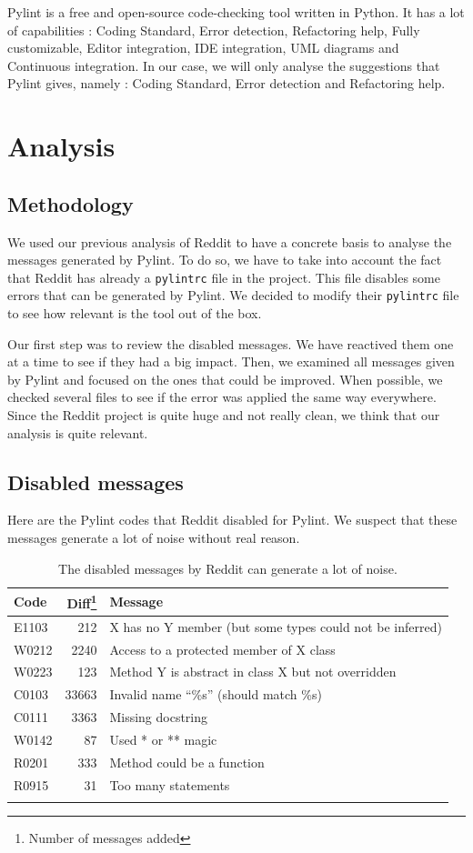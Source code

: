 \documentclass[12pt, a4paper]{article}
\newcommand{\pyl}{\textsf{Pylint}}
\begin{document}
\pyl{} is a free and open-source code-checking tool written in Python.
It has a lot of capabilities : Coding Standard, Error detection, Refactoring help, Fully customizable, Editor integration, IDE integration, UML diagrams and Continuous integration.
In our case, we will only analyse the suggestions that \pyl{} gives, namely : Coding Standard, Error detection and Refactoring help.
\bigskip
\section*{Analysis}
\smallskip
\subsection*{Methodology}

We used our previous analysis of Reddit to have a concrete basis to analyse the messages generated by \pyl{}.
To do so, we have to take into account the fact that Reddit has already a \texttt{pylintrc} file in the project.
This file disables some errors that can be generated by \pyl{}.
We decided to modify their \texttt{pylintrc} file to see how relevant is the tool out of the box.\\
\medskip


Our first step was to review the disabled messages.
We have reactived them one at a time to see if they had a big impact.
Then, we examined all messages given by \pyl{} and focused on the ones that could be improved.
When possible, we checked several files to see if the error was applied the same way everywhere.
Since the Reddit project is quite huge and not really clean, we think that our analysis is quite relevant.
\newpage
\subsection*{Disabled messages}
Here are the \pyl{} codes that Reddit disabled for \pyl{}. 
We suspect that these messages generate a lot of noise without real reason.
\\

\begin{longtable}{|l|r|m{9cm}|}
\hline
\textbf{\small{Code}} & \textbf{\small{Diff\footnote{Number of messages added}}} & \textbf{\small{Message}} \\
\hline
\hline
E1103 & 212 & X has no Y member (but some types could not be inferred) \\
\hline
W0212 & 2240  & Access to a protected member of X class \\
\hline
W0223 & 123 & Method Y is abstract in class X but not overridden \\
\hline
C0103 & 33663 & Invalid name ``\%s'' (should match \%s) \\
\hline
C0111 & 3363 & Missing docstring \\
\hline
W0142 & 87 & Used * or ** magic \\
\hline
R0201 & 333 & Method could be a function \\
\hline
R0915 & 31 & Too many statements \\
\hline
\caption{\label{messages} The disabled messages by Reddit can generate a lot of noise. }
\end{longtable}
\end{document}
